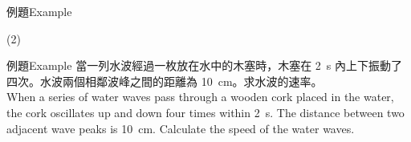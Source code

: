 \documentclass[beamer=true]{standalone}
\begin{document}
\begin{frame}[t]{例題Example}
    \begin{tasks}[label-offset=.6em,item-indent=2em](2)
        \task {}
        \task {}
        \task {}
        \task {}
    \end{tasks}
\end{frame}

\begin{frame}[t]{例題Example}
    當一列水波經過一枚放在水中的木塞時，木塞在 \qty{2}{s} 內上下振動了四次。水波兩個相鄰波峰之間的距離為 \qty{10}{cm}。求水波的速率。\\When a series of water waves pass through a wooden cork placed in the water, the cork oscillates up and down four times within \qty{2}{s}. The distance between two adjacent wave peaks is \qty{10}{cm}. Calculate the speed of the water waves.
\end{frame}
\end{document}
